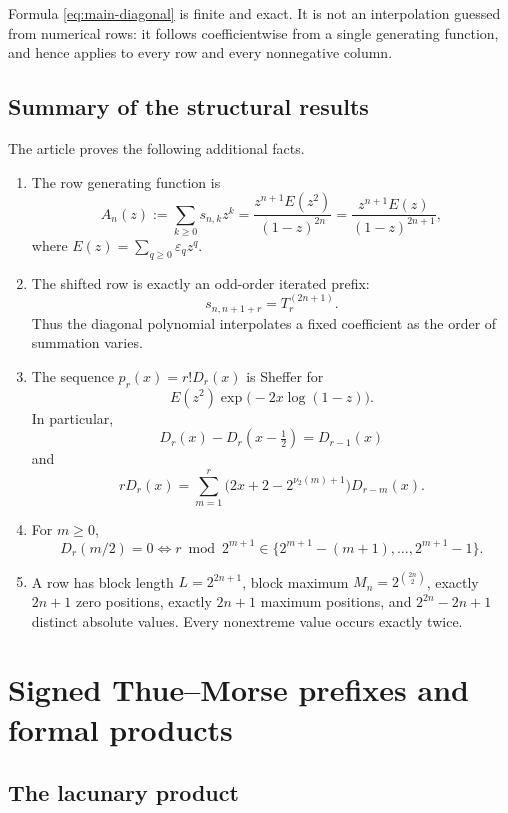 \documentclass[11pt,oneside]{article}
\numberwithin{equation}{section}
\theoremstyle{definition}
\theoremstyle{remark}
\newcommand{\eps}{\varepsilon}
\newcommand{\nuTwo}{\nu_2}
\newcommand{\Diag}{D}
\newcommand{\Prefix}{T}
\begin{document}
Formula \eqref{eq:main-diagonal} is finite and exact.  It is not an
interpolation guessed from numerical rows: it follows coefficientwise from a
single generating function, and hence applies to every row and every
nonnegative column.

\subsection{Summary of the structural results}

The article proves the following additional facts.

\begin{enumerate}
\item The row generating function is
\[
 A_n(z):=\sum_{k\ge0}s_{n,k}z^k
 =\frac{z^{n+1}E(z^2)}{(1-z)^{2n}}
 =\frac{z^{n+1}E(z)}{(1-z)^{2n+1}},
\]
where \(E(z)=\sum_{q\ge0}\eps_qz^q\).

\item The shifted row is exactly an odd-order iterated prefix:
\[
 s_{n,n+1+r}=\Prefix_r^{(2n+1)}.
\]
Thus the diagonal polynomial interpolates a fixed coefficient as the order of
summation varies.

\item The sequence \(p_r(x)=r!\Diag_r(x)\) is Sheffer for
\[
 E(z^2)\exp\!\bigl(-2x\log(1-z)\bigr).
\]
In particular,
\[
 \Diag_r(x)-\Diag_r(x-\tfrac12)=\Diag_{r-1}(x)
\]
and
\[
 r\Diag_r(x)=\sum_{m=1}^r
 \bigl(2x+2-2^{\nuTwo(m)+1}\bigr)\Diag_{r-m}(x).
\]

\item For \(m\ge0\),
\[
 \Diag_r(m/2)=0
 \iff
 r\bmod 2^{m+1}\in
 \{2^{m+1}-(m+1),\ldots,2^{m+1}-1\}.
\]

\item A row has block length \(L=2^{2n+1}\), block maximum
\(M_n=2^{\binom{2n}{2}}\), exactly \(2n+1\) zero positions, exactly
\(2n+1\) maximum positions, and
\(2^{2n}-2n+1\) distinct absolute values.  Every nonextreme value occurs
exactly twice.
\end{enumerate}

\section{Signed Thue--Morse prefixes and formal products}

\subsection{The lacunary product}
\end{document}
